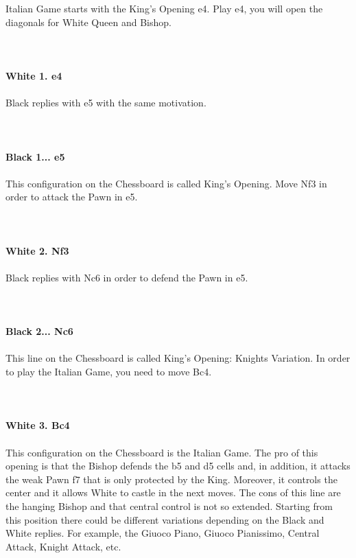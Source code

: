 \documentclass{article}
\begin{document}
Italian Game starts with the King’s Opening e4. Play e4, you will open the diagonals for White Queen and Bishop.\\
\\

\\
\\
\textbf{White 1. e4}\\
\\
Black replies with e5 with the same motivation.\\
\\

\\
\\
\textbf{Black 1... e5}\\
\\
This configuration on the Chessboard is called King's Opening. Move Nf3 in order to attack the Pawn in e5.\\
\\

\\
\\
\textbf{White 2. Nf3}\\
\\
Black replies with Nc6 in order to defend the Pawn in e5.\\
\\

\\
\\
\textbf{Black 2... Nc6}\\
\\
This line on the Chessboard is called King's Opening: Knights Variation. In order to play the Italian Game, you need to move Bc4.\\
\\

\\
\\
\textbf{White 3. Bc4}\\
\\
This configuration on the Chessboard is the Italian Game. The pro of this opening is that the Bishop defends the b5 and d5 cells and, in addition, it attacks the weak Pawn f7 that is only protected by the King. Moreover, it controls the center and it allows White to castle in the next moves. The cons of this line are the hanging Bishop and that central control is not so extended. Starting from this position there could be different variations depending on the Black and White replies. For example, the Giuoco Piano, Giuoco Pianissimo, Central Attack, Knight Attack, etc.\\
\\
\end{document}
